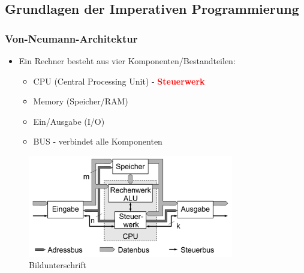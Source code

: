 \subsection{Grundlagen der Imperativen Programmierung}



\subsubsection{Von-Neumann-Architektur}

\begin{itemize}
	\item Ein Rechner besteht aus vier Komponenten/Bestandteilen:
	\begin{itemize}
		\item CPU (Central Processing Unit) - \textcolor{red}{\textbf{Steuerwerk}}
		\item Memory (Speicher/RAM)
		\item Ein/Ausgabe (I/O)
		\item BUS - verbindet alle Komponenten
	\end{itemize}
\end{itemize}

\begin{figure}[h!] %
	\centering %
	\includegraphics[width=0.8\textwidth]{Bilder/Von-Neumann-Architektur}
	\caption{Bildunterschrift}
	\label{fig:Bild} %
\end{figure}


